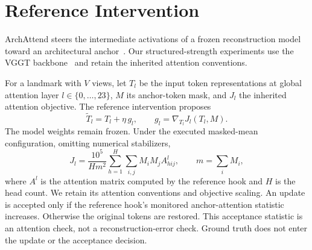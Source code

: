 \section{Reference Intervention}
\label{sec:reference}
ArchAttend steers the intermediate activations of a frozen reconstruction model toward an architectural anchor~\cite{archworld}. Our structured-strength experiments use the VGGT backbone~\cite{vggt} and retain the inherited attention conventions.

For a landmark with $V$ views, let $T_l$ be the input token representations at global attention layer $l\in\{0,\ldots,23\}$, $M$ its anchor-token mask, and $J_l$ the inherited attention objective. The reference intervention proposes
\begin{equation}
 \widetilde T_l = T_l + \eta\,g_l,
 \qquad g_l=\nabla_{T_l}J_l(T_l,M).
 \label{eq:structured-update}
\end{equation}
The model weights remain frozen. Under the executed masked-mean configuration, omitting numerical stabilizers,
\begin{equation}
 J_l=\frac{10^5}{H m^2}\sum_{h=1}^{H}\sum_{i,j}M_iM_j A^l_{hij},
 \qquad m=\sum_iM_i,
 \label{eq:structured-objective}
\end{equation}
where $A^l$ is the attention matrix computed by the reference hook and $H$ is the head count. We retain its attention conventions and objective scaling. An update is accepted only if the reference hook's monitored anchor-attention statistic increases. Otherwise the original tokens are restored. This acceptance statistic is an attention check, not a reconstruction-error check. Ground truth does not enter the update or the acceptance decision.
